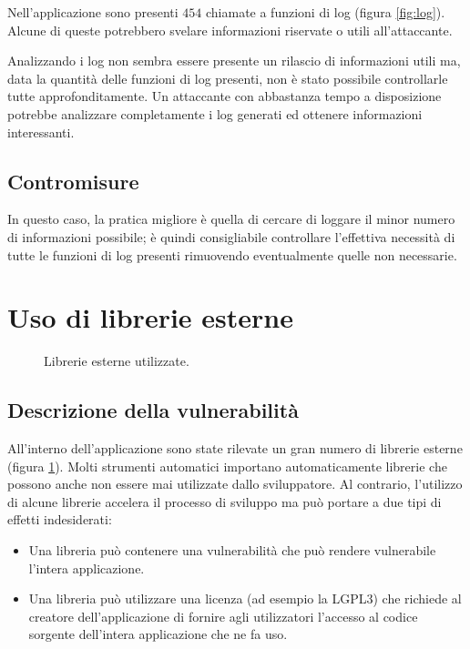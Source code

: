 Nell'applicazione sono presenti $454$ chiamate a funzioni di log (figura \ref{fig:log}). Alcune di queste potrebbero svelare informazioni riservate o utili all'attaccante.

Analizzando i log non sembra essere presente un rilascio di informazioni utili ma, data la quantità delle funzioni di log presenti, non è stato possibile controllarle tutte approfonditamente. Un attaccante con abbastanza tempo a disposizione potrebbe analizzare completamente i log generati ed ottenere informazioni interessanti.

\subsection{Contromisure}
In questo caso, la pratica migliore è quella di cercare di loggare il minor numero di informazioni possibile; è quindi consigliabile controllare l'effettiva necessità di tutte le funzioni di log presenti rimuovendo eventualmente quelle non necessarie.

\section{Uso di librerie esterne}

\begin{figure}[h]
	\centering 
	\caption{Librerie esterne utilizzate.}
	\label{fig:librerie}
\end{figure}

\subsection{Descrizione della vulnerabilità}

All'interno dell'applicazione sono state rilevate un gran numero di librerie esterne (figura \ref{fig:librerie}). Molti strumenti automatici importano automaticamente librerie che possono anche non essere mai utilizzate dallo sviluppatore. Al contrario, l'utilizzo di alcune librerie accelera il processo di sviluppo ma può portare a due tipi di effetti indesiderati:

\begin{itemize}
	\item Una libreria può contenere una vulnerabilità che può rendere vulnerabile l'intera applicazione.
	\item Una libreria può utilizzare una licenza (ad esempio la LGPL$3$) che richiede al creatore dell'applicazione di fornire agli utilizzatori l'accesso al codice sorgente dell'intera applicazione che ne fa uso.
\end{itemize}

